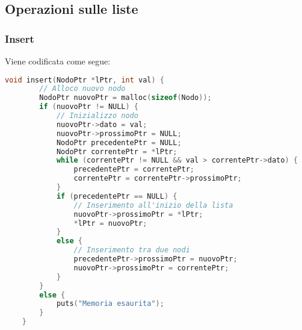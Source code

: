 \subsection{Operazioni sulle liste}
\subsubsection{Insert}
Viene codificata come segue:
\begin{lstlisting}[language=C, caption=Esempio di una struct]
	void insert(NodoPtr *lPtr, int val) {
		// Alloco nuovo nodo
		NodoPtr nuovoPtr = malloc(sizeof(Nodo));
		if (nuovoPtr != NULL) {
			// Inizializzo nodo
			nuovoPtr->dato = val;
			nuovoPtr->prossimoPtr = NULL;
			NodoPtr precedentePtr = NULL;
			NodoPtr correntePtr = *lPtr;
			while (correntePtr != NULL && val > correntePtr->dato) {
				precedentePtr = correntePtr;
				correntePtr = correntePtr->prossimoPtr;
			}
			if (precedentePtr == NULL) {
				// Inserimento all'inizio della lista
				nuovoPtr->prossimoPtr = *lPtr;
				*lPtr = nuovoPtr;
			}
			else {
				// Inserimento tra due nodi
				precedentePtr->prossimoPtr = nuovoPtr;
				nuovoPtr->prossimoPtr = correntePtr;
			}
		}
		else {
			puts("Memoria esaurita");
		}
	}
\end{lstlisting}